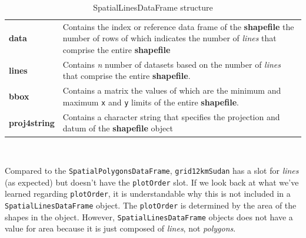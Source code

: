 \documentclass[12pt,a4paper,a4paper]{book}
\theoremstyle{definition}
\theoremstyle{definition}
\theoremstyle{definition}
\theoremstyle{remark}
\begin{document}
\begin{longtable}[]{@{}ll@{}}
\caption{\label{tab:table3} SpatialLinesDataFrame structure}\tabularnewline
\toprule
\begin{minipage}[t]{0.32\columnwidth}\raggedright
\textbf{data}\strut
\end{minipage} & \begin{minipage}[t]{0.62\columnwidth}\raggedright
Contains the index or reference data frame of the \textbf{shapefile} the
number of rows of which indicates the number of \emph{lines} that
comprise the entire \textbf{shapefile}\strut
\end{minipage}\tabularnewline
\begin{minipage}[t]{0.32\columnwidth}\raggedright
\textbf{lines}\strut
\end{minipage} & \begin{minipage}[t]{0.62\columnwidth}\raggedright
Contains \emph{n} number of datasets based on the number of \emph{lines}
that comprise the entire \textbf{shapefile}.\strut
\end{minipage}\tabularnewline
\begin{minipage}[t]{0.32\columnwidth}\raggedright
\textbf{bbox}\strut
\end{minipage} & \begin{minipage}[t]{0.62\columnwidth}\raggedright
Contains a matrix the values of which are the minimum and maximum
\texttt{x} and \texttt{y} limits of the entire \textbf{shapefile}.\strut
\end{minipage}\tabularnewline
\begin{minipage}[t]{0.32\columnwidth}\raggedright
\textbf{proj4string}\strut
\end{minipage} & \begin{minipage}[t]{0.62\columnwidth}\raggedright
Contains a character string that specifies the projection and datum of
the \textbf{shapefile} object\strut
\end{minipage}\tabularnewline
\bottomrule
\end{longtable}

~

Compared to the \texttt{SpatialPolygonsDataFrame},
\texttt{grid12kmSudan} has a slot for \emph{lines} (as expected) but
doesn't have the \texttt{plotOrder} slot. If we look back at what we've
learned regarding \texttt{plotOrder}, it is understandable why this is
not included in a \texttt{SpatialLinesDataFrame} object. The
\texttt{plotOrder} is determined by the area of the shapes in the
object. However, \texttt{SpatialLinesDataFrame} objects does not have a
value for area because it is just composed of \emph{lines}, not
\emph{polygons}.
\end{document}
